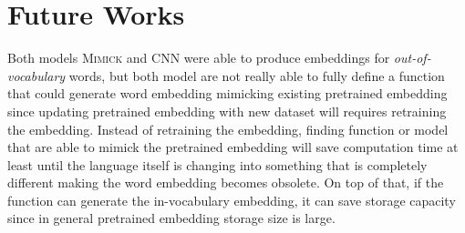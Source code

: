 \section{Future Works}
Both models \textsc{Mimick} and CNN were able to produce embeddings
for \textit{out-of-vocabulary} words, but both model are not really
able to fully define a function that could generate word embedding
mimicking existing pretrained embedding since updating pretrained
embedding with new dataset will requires retraining the embedding.
Instead of retraining the embedding, finding function or model that
are able to mimick the pretrained embedding will save computation time
at least until the language itself is changing into something that is
completely different making the word embedding becomes obsolete. On
top of that, if the function can generate the in-vocabulary embedding,
it can save storage capacity since in general pretrained embedding
storage size is large.